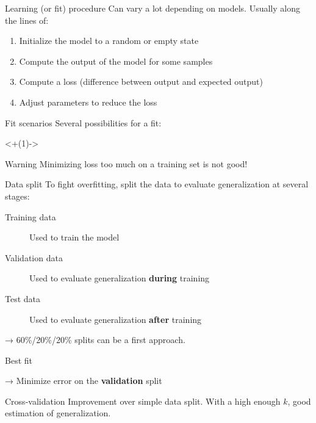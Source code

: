 \begin{frame}{Learning (or fit) procedure}
  Can vary a lot depending on models. Usually along the lines of:
  \begin{enumerate}[<+(1)->]
    \item Initialize the model to a random or empty state
    \item Compute the output of the model for some samples
    \item Compute a loss (difference between output and expected output)
    \item Adjust parameters to reduce the loss
  \end{enumerate}
\end{frame}

\begin{frame}{Fit scenarios}
  Several possibilities for a fit:


  \onslide<+(1)->{
    \begin{alertblock}{Warning}
      Minimizing loss too much on a training set is not good!
    \end{alertblock}
  }
\end{frame}

\begin{frame}{Data split}
  To fight overfitting, split the data to evaluate generalization at several stages:
  \begin{description}
  \item[Training data] Used to train the model
  \item[Validation data] Used to evaluate generalization \textbf{during} training
  \item[Test data] Used to evaluate generalization \textbf{after} training
  \end{description}
  → 60\%/20\%/20\% splits can be a first approach.
\end{frame}

\begin{frame}{Best fit}


  → Minimize error on the \textbf{validation} split
\end{frame}

\begin{frame}{Cross-validation}
  Improvement over simple data split. With a high enough $k$, good estimation of generalization.
\end{frame}

